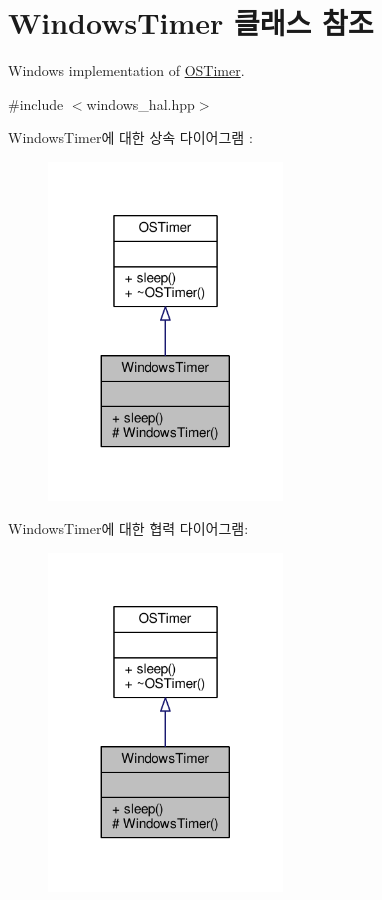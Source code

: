 \hypertarget{class_windows_timer}{}\section{Windows\+Timer 클래스 참조}
\label{class_windows_timer}


Windows implementation of \hyperlink{class_o_s_timer}{O\+S\+Timer}.  




{\ttfamily \#include $<$windows\+\_\+hal.\+hpp$>$}



Windows\+Timer에 대한 상속 다이어그램 \+: 
\nopagebreak
\begin{figure}[H]
\begin{center}
\leavevmode
\includegraphics[width=176pt]{class_windows_timer__inherit__graph}
\end{center}
\end{figure}


Windows\+Timer에 대한 협력 다이어그램\+:
\nopagebreak
\begin{figure}[H]
\begin{center}
\leavevmode
\includegraphics[width=176pt]{class_windows_timer__coll__graph}
\end{center}
\end{figure}
